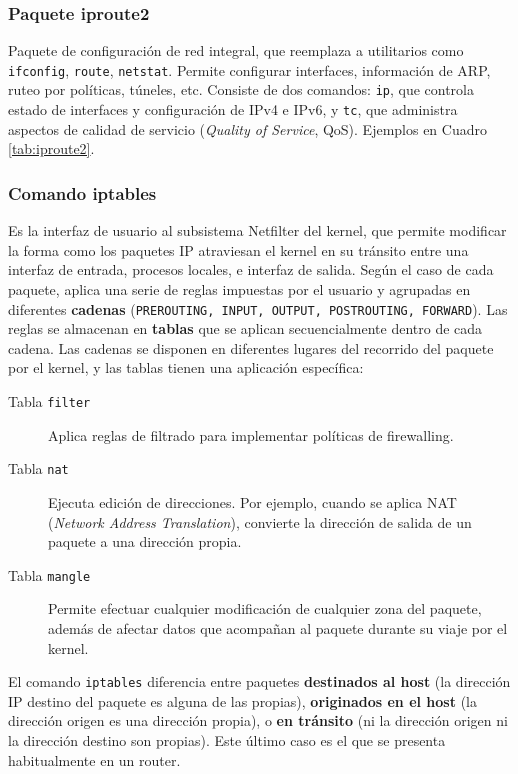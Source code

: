 \subsubsection{Paquete iproute2}
Paquete de configuración de red integral, que reemplaza a utilitarios como \texttt{ifconfig}, \texttt{route}, \texttt{netstat}. Permite configurar interfaces, información de ARP, ruteo por políticas, túneles, etc. Consiste de dos comandos: \texttt{ip}, que controla estado de interfaces y configuración de IPv4 e IPv6, y \texttt{tc}, que administra aspectos de calidad de servicio (\textit{Quality of Service}, QoS). Ejemplos en Cuadro \ref{tab:iproute2}.

\subsubsection{Comando iptables}
Es la interfaz de usuario al subsistema Netfilter del kernel, que permite modificar la forma como los paquetes IP atraviesan el kernel en su tránsito entre una interfaz de entrada, procesos locales, e interfaz de salida. Según el caso de cada paquete, aplica una serie de reglas impuestas por el usuario y agrupadas en diferentes \textbf{cadenas} (\texttt{PREROUTING, INPUT, OUTPUT, POSTROUTING, FORWARD}). Las reglas se almacenan en \textbf{tablas} que se aplican secuencialmente dentro de cada cadena. Las cadenas se disponen en diferentes lugares del recorrido del paquete por el kernel, y las tablas tienen una aplicación específica:

\begin{description}
	\item[Tabla \texttt{filter}] Aplica reglas de filtrado para implementar políticas de firewalling. 
	\item[Tabla \texttt{nat}] Ejecuta edición de direcciones. Por ejemplo, cuando se aplica NAT (\textit{Network Address Translation}), convierte la dirección de salida de un paquete a una dirección propia.
	\item[Tabla \texttt{mangle}] Permite efectuar cualquier modificación de cualquier zona del paquete, además de afectar datos que acompañan al paquete durante su viaje por el kernel. 
\end{description}

El comando \texttt{iptables} diferencia entre paquetes \textbf{destinados al host} (la dirección IP destino del paquete es alguna de las propias), \textbf{originados en el host} (la dirección origen es una dirección propia), o \textbf{en tránsito} (ni la dirección origen ni la dirección destino son propias). Este último caso es el que se presenta habitualmente en un router. 

